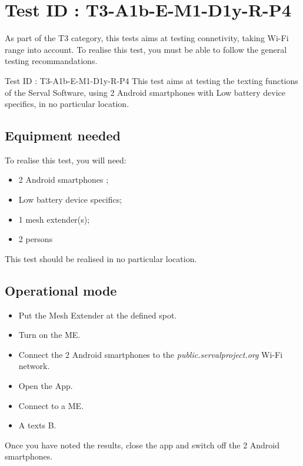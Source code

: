 \documentclass[oneside]{book}
\begin{document}
\section{Test ID : T3-A1b-E-M1-D1y-R-P4}
\begin{itshape}
As part of the T3 category, this tests aims at testing connetivity, taking Wi-Fi range into account.
To realise this test, you must be able to follow the general testing recommandations.
\end{itshape}
\newline
Test ID : T3-A1b-E-M1-D1y-R-P4
 This test aims at testing the texting functions of the Serval Software, using 2 Android smartphones with Low battery device specifics, in no particular location.
\subsection{Equipment needed} To realise this test, you will need:
\begin{itemize}
\item 2 Android smartphones ;
\item Low battery device specifics;
\item 1 mesh extender(s);
\item 2 persons
\end{itemize}
This test should be realised in no particular location.
\subsection{Operational mode} \begin{itemize}
\item Put the Mesh Extender at the defined spot.
\item Turn on the ME.
\item Connect the 2 Android smartphones to the \emph{public.servalproject.org} Wi-Fi network.
\item Open the App.
\item Connect to a ME.
\item A texts B.
\end{itemize}
Once you have noted the results, close the app and switch off the 2 Android smartphones.
\end{document}
